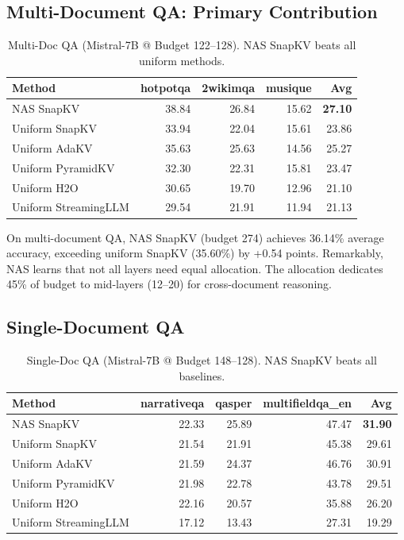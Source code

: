 \documentclass[11pt]{article}
\begin{document}
\subsection{Multi-Document QA: Primary Contribution}

\begin{table}[h]
\centering
\footnotesize
\renewcommand{\arraystretch}{1.2}
\begin{tabular}{@{}l r r r r@{}}
\toprule
\textbf{Method} & \textbf{hotpotqa} & \textbf{2wikimqa} & \textbf{musique} & \textbf{Avg} \\
\midrule
NAS SnapKV & 38.84 & 26.84 & 15.62 & \textbf{27.10} \\
Uniform SnapKV & 33.94 & 22.04 & 15.61 & 23.86 \\
Uniform AdaKV & 35.63 & 25.63 & 14.56 & 25.27 \\
Uniform PyramidKV & 32.30 & 22.31 & 15.81 & 23.47 \\
Uniform H2O & 30.65 & 19.70 & 12.96 & 21.10 \\
Uniform StreamingLLM & 29.54 & 21.91 & 11.94 & 21.13 \\
\bottomrule
\end{tabular}
\caption{Multi-Doc QA (Mistral-7B @ Budget 122–128). NAS SnapKV beats all uniform methods.}
\label{tab:multidoc}
\end{table}

On multi-document QA, NAS SnapKV (budget 274) achieves 36.14\% average accuracy, exceeding uniform SnapKV (35.60\%) by +0.54 points. Remarkably, NAS learns that not all layers need equal allocation. The allocation dedicates 45\% of budget to mid-layers (12–20) for cross-document reasoning.

\subsection{Single-Document QA}

\begin{table}[h]
\centering
\footnotesize
\renewcommand{\arraystretch}{1.2}
\begin{tabular}{@{}l r r r r@{}}
\toprule
\textbf{Method} & \textbf{narrativeqa} & \textbf{qasper} & \textbf{multifieldqa\_en} & \textbf{Avg} \\
\midrule
NAS SnapKV & 22.33 & 25.89 & 47.47 & \textbf{31.90} \\
Uniform SnapKV & 21.54 & 21.91 & 45.38 & 29.61 \\
Uniform AdaKV & 21.59 & 24.37 & 46.76 & 30.91 \\
Uniform PyramidKV & 21.98 & 22.78 & 43.78 & 29.51 \\
Uniform H2O & 22.16 & 20.57 & 35.88 & 26.20 \\
Uniform StreamingLLM & 17.12 & 13.43 & 27.31 & 19.29 \\
\bottomrule
\end{tabular}
\caption{Single-Doc QA (Mistral-7B @ Budget 148–128). NAS SnapKV beats all baselines.}
\label{tab:singledoc}
\end{table}
\end{document}
